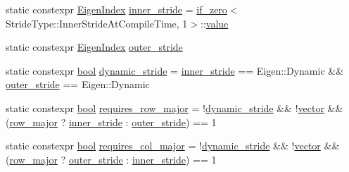 \begin{DoxyCompactItemize}
\item 
static constexpr \mbox{\hyperlink{eigen_8h_a4e595ab182718d84a409dd05e0829bdd}{Eigen\+Index}} \mbox{\hyperlink{struct_eigen_props_aadd1cceef220ef97abe8eb74f1f78ecd}{inner\+\_\+stride}} = \mbox{\hyperlink{struct_eigen_props_aa728072a2702217ee987bf9ab3b9d07d}{if\+\_\+zero}}$<$Stride\+Type\+::\+Inner\+Stride\+At\+Compile\+Time, 1$>$\+::\mbox{\hyperlink{_s_d_l__opengl__glext_8h_a8ad81492d410ff2ac11f754f4042150f}{value}}
\item 
static constexpr \mbox{\hyperlink{eigen_8h_a4e595ab182718d84a409dd05e0829bdd}{Eigen\+Index}} \mbox{\hyperlink{struct_eigen_props_ac31d9e8cc3baff0f804000486c35759d}{outer\+\_\+stride}}
\item 
static constexpr \mbox{\hyperlink{asdl_8h_af6a258d8f3ee5206d682d799316314b1}{bool}} \mbox{\hyperlink{struct_eigen_props_a32861acd4f8d759619f7a3438a5a56a4}{dynamic\+\_\+stride}} = \mbox{\hyperlink{struct_eigen_props_aadd1cceef220ef97abe8eb74f1f78ecd}{inner\+\_\+stride}} == Eigen\+::\+Dynamic \&\& \mbox{\hyperlink{struct_eigen_props_ac31d9e8cc3baff0f804000486c35759d}{outer\+\_\+stride}} == Eigen\+::\+Dynamic
\item 
static constexpr \mbox{\hyperlink{asdl_8h_af6a258d8f3ee5206d682d799316314b1}{bool}} \mbox{\hyperlink{struct_eigen_props_a71445c69c5e4084c30449ff2207571c7}{requires\+\_\+row\+\_\+major}} = !\mbox{\hyperlink{struct_eigen_props_a32861acd4f8d759619f7a3438a5a56a4}{dynamic\+\_\+stride}} \&\& !\mbox{\hyperlink{struct_eigen_props_a6c26ad4c67abd91b08285b63afed9ab9}{vector}} \&\& (\mbox{\hyperlink{struct_eigen_props_a290ebf6baed2dca134f928c13dda4030}{row\+\_\+major}} ? \mbox{\hyperlink{struct_eigen_props_aadd1cceef220ef97abe8eb74f1f78ecd}{inner\+\_\+stride}} \+: \mbox{\hyperlink{struct_eigen_props_ac31d9e8cc3baff0f804000486c35759d}{outer\+\_\+stride}}) == 1
\item 
static constexpr \mbox{\hyperlink{asdl_8h_af6a258d8f3ee5206d682d799316314b1}{bool}} \mbox{\hyperlink{struct_eigen_props_a070c53f0e952e411c98e3ddfdbeaae3d}{requires\+\_\+col\+\_\+major}} = !\mbox{\hyperlink{struct_eigen_props_a32861acd4f8d759619f7a3438a5a56a4}{dynamic\+\_\+stride}} \&\& !\mbox{\hyperlink{struct_eigen_props_a6c26ad4c67abd91b08285b63afed9ab9}{vector}} \&\& (\mbox{\hyperlink{struct_eigen_props_a290ebf6baed2dca134f928c13dda4030}{row\+\_\+major}} ? \mbox{\hyperlink{struct_eigen_props_ac31d9e8cc3baff0f804000486c35759d}{outer\+\_\+stride}} \+: \mbox{\hyperlink{struct_eigen_props_aadd1cceef220ef97abe8eb74f1f78ecd}{inner\+\_\+stride}}) == 1
\item 

\end{DoxyCompactItemize}
